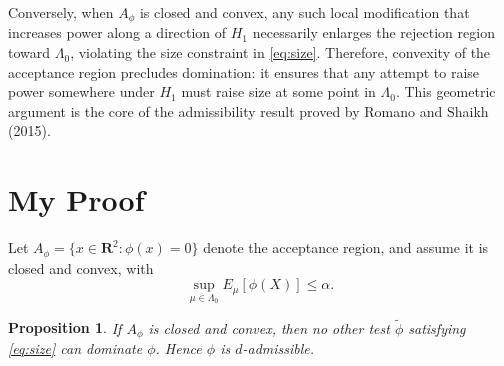 \documentclass[12pt]{article}
\newtheorem{proposition}{Proposition}
\begin{document}
Conversely, when $A_\phi$ is closed and convex, any such local modification that increases power along a direction of $H_1$ necessarily enlarges the rejection region toward $\Lambda_0$, violating the size constraint in \eqref{eq:size}.  Therefore, convexity of the acceptance region precludes domination: it ensures that any attempt to raise power somewhere under $H_1$ must raise size at some point in $\Lambda_0$.  This geometric argument is the core of the admissibility result proved by Romano and Shaikh (2015).

\section*{My Proof}
Let $A_\phi = \{x \in \mathbf{R}^2 : \phi(x) = 0\}$ denote the acceptance region, and assume it is closed and convex, with
\[
\sup_{\mu \in \Lambda_0} E_\mu[\phi(X)] \le \alpha. \tag{2}
\]

\begin{proposition}
If $A_\phi$ is closed and convex, then no other test $\tilde \phi$ satisfying \eqref{eq:size} can dominate $\phi$. Hence $\phi$ is $d$-admissible.
\end{proposition}
\end{document}
